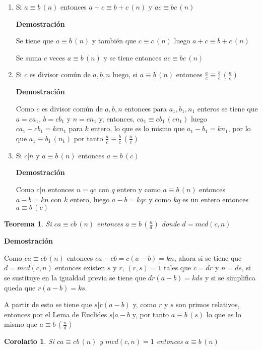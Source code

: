 \documentclass[a4paper,12pt]{report}
\newtheorem*{teo}{Teorema}
\newtheorem*{cor}{Corolario}
\begin{document}
\begin{enumerate}
 \item Si $a \equiv b \, (n)$ entonces $a+c \equiv b+c \, (n)$ y  $ac \equiv bc \, (n)$
 
 \textbf{Demostración}
 
Se tiene que $a \equiv b \, (n)$ y también que $c \equiv c \, (n)$ luego $a+c \equiv b+c \, (n)$

Se suma $c$ veces $a \equiv b \, (n)$ y se tiene entonces $ac \equiv bc \, (n)$
 
 \item Si $c$ es divisor común de $a,b,n$ luego, si $a \equiv b \, (n)$ entonces $\frac{a}{c} \equiv \frac{b}{c} \, (\frac{n}{c})$
 
\textbf{Demostración}
 
 Como $c$ es divisor común de $a,b,n$ entonces para $a_1,b_1,n_1$ enteros se tiene que $a=ca_1$, $b=cb_1$ y $n=cn_1$ y, entonces, $ca_1 \equiv cb_1 \, (cn_1)$ luego $ca_1-cb_1=kcn_1$ para $k$ entero, lo que es lo mismo que $a_1-b_1=kn_1$, por lo que $a_1 \equiv b_1 \, (n_1)$ por tanto $\frac{a}{c} \equiv \frac{b}{c} \, (\frac{n}{c})$
 
 \item Si $c|n$ y $a \equiv b \, (n)$ entonces $a \equiv b \, (c)$

 \textbf{Demostración}
 
 Como $c|n$ entonces $n=qc$ con $q$ entero y como $a \equiv b \, (n)$ entonces $a-b=kn$ con $k$ entero, luego $a-b=kqc$ y como $kq$ es un entero entonces $a \equiv b \, (c)$
 
 
\end{enumerate}


\begin{teo}
 Si $ca \equiv cb \, (n)$ entonces $a \equiv b \, (\frac{n}{d})$ donde $d=mcd(c,n)$ 
\end{teo}

\textbf{Demostración}

Como $ca \equiv cb \, (n)$ entonces $ca-cb=c(a-b)=kn$, ahora si se tiene que $d=mcd(c,n)$  
entonces existen $s$ y $r$, $(r,s)=1$ tales que $c=dr$ y $n=ds$, si se sustituye en la igualdad previa se tiene que $dr(a-b)=kds$ y si se simplifica queda que $r(a-b)=ks$. 

A partir de esto se tiene que $s|r(a-b)$ y, como $r$ y $s$ son primos relativos, entonces por el Lema de Euclides $s|a-b$ y, por tanto $a\equiv b \, (s)$ lo que es lo mismo que $a\equiv b \, (\frac{n}{d})$


\begin{cor}
 Si $ca \equiv cb \, (n)$ y $mcd(c,n)=1$ entonces $a \equiv b \, (n)$
\end{cor}
\end{document}
